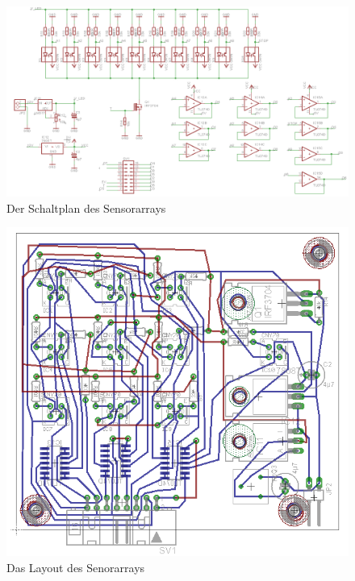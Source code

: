 \documentclass[a4paper,bibtotoc,oneside]{scrbook}
\begin{document}
\begin{figure}[htbp]
\centering
\includegraphics[width=125mm]{img/array.png}
\caption{Der Schaltplan des Sensorarrays}\label{array}
\end{figure}

\begin{figure}[htbp]
\centering
\includegraphics[width=125mm]{img/array2.png}
\caption{Das Layout des Senorarrays}\label{array2}
\end{figure}
\end{document}

